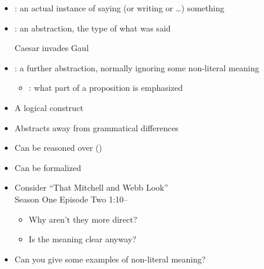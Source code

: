 \documentclass[headrule,footrule]{foils}
\begin{document}
\begin{itemize}
\item {}: an actual instance of saying (or writing  or \ldots) something
\item {}: an abstraction, the type of what was said
  \begin{exe}
    \ex Caesar invades Gaul
  \end{exe}
\item {}: a further abstraction, normally ignoring some non-literal meaning
  \begin{exe}
    \ex {}
  \end{exe}
  \begin{itemize}
  \item {}: what part of a proposition is emphasized
 \begin{exe}
   \ex {}
   \ex {}
   \ex {}
   \ex {}
  \end{exe}
  \end{itemize}

\end{itemize}
\begin{itemize}
\item A logical construct
\item Abstracts away from grammatical differences
\begin{exe}
  \ex {}
  \ex {}
  \ex  {} 
\end{exe}
\item Can be reasoned over ()
\item Can be formalized
\\ 
\end{itemize}

\begin{itemize}
\item Consider “That Mitchell  and Webb Look”
\\ Season One Episode Two 1:10--
\begin{itemize}
\item Why aren’t they more direct?\task
\item Is the meaning clear anyway?\task
\end{itemize}
\item Can you give some examples of non-literal meaning?\task
\end{itemize}
\end{document}
